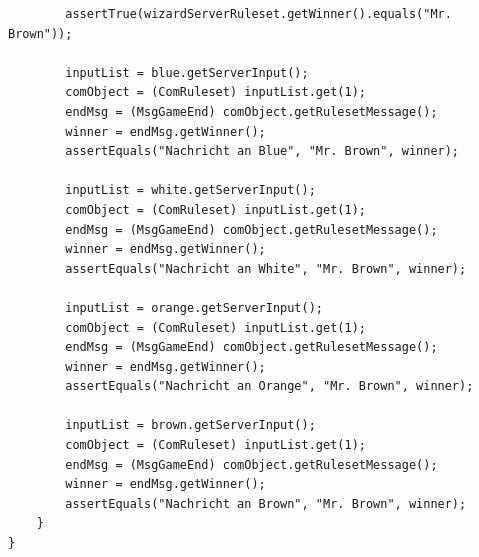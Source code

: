 \documentclass[twoside]{article}
\begin{document}
\begin{lstlisting}
		assertTrue(wizardServerRuleset.getWinner().equals("Mr. Brown"));
		
		inputList = blue.getServerInput();
		comObject = (ComRuleset) inputList.get(1);
		endMsg = (MsgGameEnd) comObject.getRulesetMessage();
		winner = endMsg.getWinner();
		assertEquals("Nachricht an Blue", "Mr. Brown", winner);

		inputList = white.getServerInput();
		comObject = (ComRuleset) inputList.get(1);
		endMsg = (MsgGameEnd) comObject.getRulesetMessage();
		winner = endMsg.getWinner();
		assertEquals("Nachricht an White", "Mr. Brown", winner);

		inputList = orange.getServerInput();
		comObject = (ComRuleset) inputList.get(1);
		endMsg = (MsgGameEnd) comObject.getRulesetMessage();
		winner = endMsg.getWinner();
		assertEquals("Nachricht an Orange", "Mr. Brown", winner);
	
		inputList = brown.getServerInput();
		comObject = (ComRuleset) inputList.get(1);
		endMsg = (MsgGameEnd) comObject.getRulesetMessage();
		winner = endMsg.getWinner();
		assertEquals("Nachricht an Brown", "Mr. Brown", winner);
	}
}

\end{lstlisting}
\end{document}

